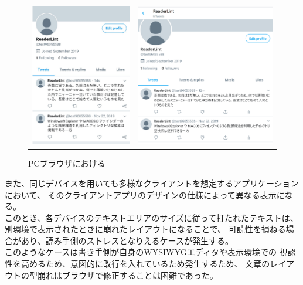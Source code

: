 \begin{figure}[H]
    \begin{tabular}{cc}
        \begin{minipage}[t]{0.5\hsize}
            \centering
            \label{fig:image2}
            \includegraphics[keepaspectratio, width=0.5\columnwidth]{image/01/img3.jpg}
            \caption[Androidにおける] {スマホの画面の比較}
        \end{minipage}&

        \begin{minipage}[t]{0.5\hsize}
            \centering
            \label{fig:image3}
            \includegraphics[keepaspectratio, width=0.5\columnwidth]{image/01/img4.png}
            \caption[PCブラウザにおける] {PCブラウザにおける}
        \end{minipage}
    \end{tabular}
\end{figure}

また、同じデバイスを用いても多様なクライアントを想定するアプリケーションにおいて、
そのクライアントアプリのデザインの仕様によって異なる表示になる。
\\このとき、各デバイスのテキストエリアのサイズに従って打たれたテキストは、
別環境で表示されたときに崩れたレイアウトになることで、
可読性を損ねる場合があり、読み手側のストレスとなりえるケースが発生する。
\\このようなケースは書き手側が自身のWYSIWYGエディタや表示環境での
視認性を高めるため、意図的に改行を入れているため発生するため、
文章のレイアウトの型崩れはブラウザで修正することは困難であった。

